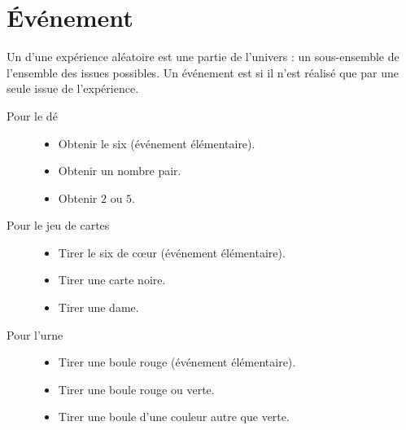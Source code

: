 \section{Événement}

\begin{definition}
    Un  d'une expérience aléatoire est une partie de l'univers : un sous-ensemble de l'ensemble des issues possibles. Un événement est  si il n'est réalisé que par une seule issue de l'expérience.
\end{definition}

\begin{example}
    \begin{description}
        \item[Pour le dé]
            \begin{itemize}
                \item Obtenir le six (événement élémentaire).
                \item
                    Obtenir un nombre pair.
                \item
                    Obtenir \( 2\) ou \( 5\).
            \end{itemize}
        \item[Pour le jeu de cartes]
    \begin{itemize}
        \item
            Tirer le six de cœur (événement élémentaire).
        \item Tirer une carte noire.
        \item
            Tirer une dame.
    \end{itemize}
\item[Pour l'urne]
    \begin{itemize}
        \item Tirer une boule rouge (événement élémentaire).
        \item
            Tirer une boule rouge ou verte.
        \item
            Tirer une boule d'une couleur autre que verte.
    \end{itemize}
    \end{description}
\end{example}

